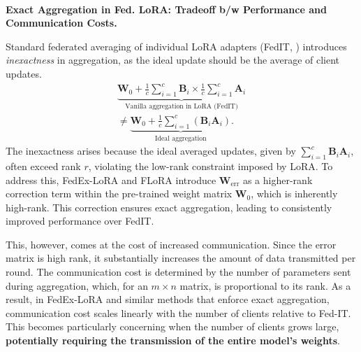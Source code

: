 \\

\textbf{Exact Aggregation in Fed. LoRA: Tradeoff b/w Performance and Communication Costs.}  

Standard federated averaging of individual LoRA adapters (FedIT, \citet{FedIT}) introduces \textit{inexactness} in aggregation, as the ideal update should be the average of client updates.
\begin{multline}  \underbrace{\mathbf{W}_0 + \frac{1}{c} \sum_{i=1}^c \mathbf{B}_i \times \frac{1}{c} \sum_{i=1}^c \mathbf{A}_i}_{\text{Vanilla aggregation in LoRA (FedIT)}} \\ \neq \underbrace{\mathbf{W}_0 + \frac{1}{c} \sum_{i=1}^c (\mathbf{B}_i \mathbf{A}_i)}_{\text{Ideal aggregation}}.
    \label{eq:fedavg-inexact}  
\end{multline}
\quad The inexactness arises because the ideal averaged updates, given by \( \sum_{i=1}^{c} \mathbf{B}_i \mathbf{A}_i \), often exceed rank \( r \), violating the low-rank constraint imposed by LoRA.  
To address this, FedEx-LoRA and FLoRA introduce \( \mathbf{W}_{\text{err}} \) as a higher-rank correction term within the pre-trained weight matrix \( \mathbf{W}_0 \), which is inherently high-rank.  
This correction ensures exact aggregation, leading to consistently improved performance over FedIT.

This, however, comes at the cost of increased communication.  
Since the error matrix is high rank, it substantially increases the amount of data transmitted per round.  
The communication cost is determined by the number of parameters sent during aggregation, which, for an \( m \times n \) matrix, is proportional to its rank.  
As a result, in FedEx-LoRA and similar methods that enforce exact aggregation, communication cost scales linearly with the number of clients relative to Fed-IT.  
This becomes particularly concerning when the number of clients grows large, \textbf{potentially requiring the transmission of the entire model’s weights}.

